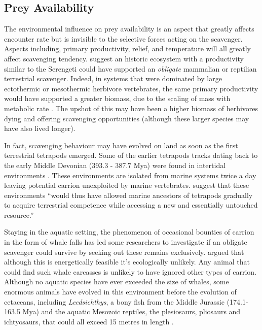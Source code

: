 \documentclass[a4paper,12pt]{article}
\begin{document}
\subsection*{Prey Availability}
The environmental influence on prey availability is an aspect that greatly affects encounter rate but is invisible to the selective forces acting on the scavenger. 
Aspects including, primary productivity, relief, and temperature will all greatly affect scavenging tendency. 
\cite{ruxton2004obligate} suggest an historic ecosystem with a productivity similar to the Serengeti could have supported an \textit{obligate} mammalian or reptilian terrestrial scavenger.
Indeed, in systems that were dominated by large ectothermic or mesothermic herbivore vertebrates, the same primary productivity would have supported a greater biomass, due to the scaling of mass with metabolic rate \citep{mcnab2009resources}.
The upshot of this may have been a higher biomass of herbivores dying and offering scavenging opportunities (although these larger species may have also lived longer).

In fact, scavenging behaviour may have evolved on land as soon as the first terrestrial tetrapods emerged.
Some of the earlier tetrapods tracks dating back to the early Middle Devonian (393.3 - 387.7 Mya) were found in intertidal environments \citep{Niedzwiedzki2009}.
These environments are isolated from marine systems twice a day leaving potential carrion unexploited by marine vertebrates.
\cite{Niedzwiedzki2009} suggest that these environments ``would thus have allowed marine ancestors of tetrapods gradually to acquire terrestrial competence while accessing a new and essentially untouched resource.''

Staying in the aquatic setting, the phenomenon of occasional bounties of carrion in the form of whale falls has led some researchers to investigate if an obligate scavenger could survive by seeking out these remains exclusively.
\cite{ruxton2005searching} argued that although this is energetically feasible it's ecologically unlikely.
Any animal that could find such whale carcasses is unlikely to have ignored other types of carrion.
Although no aquatic species have ever exceeded the size of whales, some enormous animals have evolved in this environment before the evolution of cetaceans, including \textit{Leedsichthys}, a bony fish from the Middle Jurassic (174.1-163.5 Mya) and the aquatic Mesozoic reptiles, the plesiosaurs, pliosaurs and ichtyosaurs, that could all exceed 15 metres in length \citep{ruxton2011zoology,danise2014ecological}.
\end{document}
